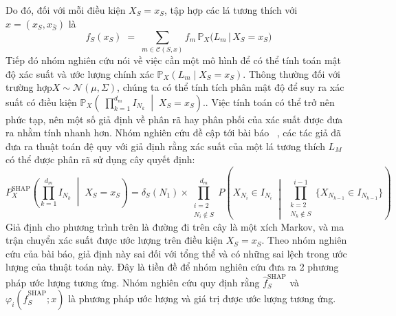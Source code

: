 \documentclass[12pt, a4paper]{article}
\theoremstyle{plain}
\theoremstyle{proposition}
\theoremstyle{lemma}
\begin{document}
Do đó, đối với mỗi điều kiện $X_S = x_S$, tập hợp các lá tương thích với 
$x = (x_S, x_{\bar{S}})$ là 
\[
f_S(x_S) \;=\; \sum_{m \in \mathcal{C}(S,x)} f_m \, \mathbb{P}_X\!\bigl(L_m \,\big|\, X_S = x_S\bigr)
\]
Tiếp đó nhóm nghiên cứu nói về việc cần một mô hình để có thể tính toán mật độ xác suất và ước lượng chính xác \(\mathbb{P}_X(L_m \mid X_S = x_S)\). Thông thường đối với trường hợp\(X \sim \mathcal{N}(\mu, \Sigma)\), chúng ta có thể tính tích phân mật độ để suy ra xác suất có điều kiện
\(
\mathbb{P}_X\!\left(\; \prod_{k=1}^{d_m} I_{N_k} \;\middle|\; X_S = x_S \right).
\). Việc tính toán có thể trở nên phức tạp, nên một số giả định về phân rã hay phân phối của xác suất được đưa ra nhằm tính nhanh hơn. Nhóm nghiên cứu đề cập tới bài báo ~\citep{lundberg2020local2global}, các tác giả đã đưa ra thuật toán đệ quy với giả định rằng xác suất của một lá tương thích $L_M$ có thể được phân rã sử dụng cây quyết định:
\[
P_X^{\text{SHAP}}\!\left(
   \prod_{k=1}^{d_m} I_{N_k} \;\middle|\; X_S = x_S
\right)
=
\delta_S(N_1) \times
\prod_{\substack{i=2 \\ N_i \notin S}}^{d_m}
P\!\left(
   X_{N_i} \in I_{N_i}
   \;\middle|\;
   \prod_{\substack{k=2 \\ N_k \notin S}}^{i-1}
   \{X_{N_{k-1}} \in I_{N_{k-1}}\}
\right)
\]
Giả định cho phương trình trên là đường đi trên cây là một xích Markov, và ma trận chuyển xác suất được ước lượng trên điều kiện ${X_S = x_S}$. Theo nhóm nghiên cứu của bài báo, giả định này sai đối với tổng thể và có những sai lệch trong ước lượng của thuật toán này. Đây là tiền đề để nhóm nghiên cứu đưa ra 2 phương pháp ước lượng tương ứng. Nhóm nghiên cứu quy định rằng $\hat{f}^{\text{SHAP}}_{S}$ và 
$\varphi_i\!\left(\hat{f}^{\text{SHAP}}_{S}; x\right)$ là phương pháp ước lượng và giá trị được ước lượng tương ứng.
\end{document}
